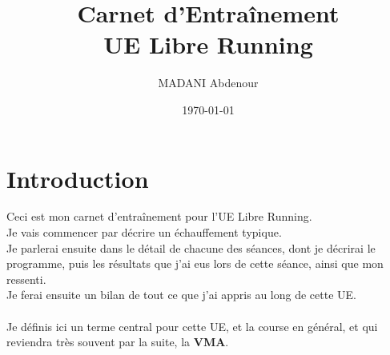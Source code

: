 \documentclass{article}
\title{Carnet d'Entraînement\\
UE Libre Running}%
\author{MADANI Abdenour}%
\date{\today}%
\begin{document}
%
\normalsize%
\maketitle%
\tableofcontents%
\newpage%

\maketitle

\section{Introduction}
    Ceci est mon carnet d'entraînement pour l'UE Libre Running.\\
    Je vais commencer par décrire un échauffement typique.\\
    Je parlerai ensuite dans le détail de chacune des séances, dont je décrirai le programme, puis les résultats que j'ai eus lors de cette séance, ainsi que mon ressenti.\\
    Je ferai ensuite un bilan de tout ce que j'ai appris au long de cette UE.\\\\
    Je définis ici un terme central pour cette UE, et la course en général, et qui reviendra très souvent par la suite, la \textbf{VMA}.
\end{document}
